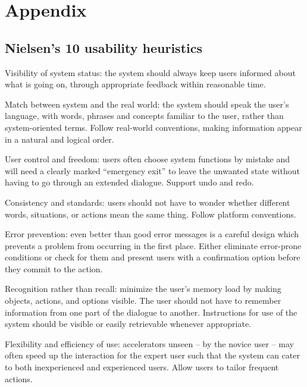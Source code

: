 \newpage
\appendix


\section{Appendix}

    \subsection{Nielsen's 10 usability heuristics}\label{appendix_nielsen}
    \begin{nielsenenumerate}
        \item Visibility of system status: the system should always keep users informed about what is going on, through appropriate feedback within reasonable time.
        \item Match between system and the real world: the system should speak the user's language, with words, phrases and concepts familiar to the user, rather than system-oriented terms. Follow real-world conventions, making information appear in a natural and logical order.
        \item User control and freedom: users often choose system functions by mistake and will need a clearly marked ``emergency exit'' to leave the unwanted state without having to go through an extended dialogue. Support undo and redo.
        \item Consistency and standards: users should not have to wonder whether different words, situations, or actions mean the same thing. Follow platform conventions.
        \item Error prevention: even better than good error messages is a careful design which prevents a problem from occurring in the first place. Either eliminate error-prone conditions or check for them and present users with a confirmation option before they commit to the action.
        \item Recognition rather than recall: minimize the user's memory load by making objects, actions, and options visible. The user should not have to remember information from one part of the dialogue to another. Instructions for use of the system should be visible or easily retrievable whenever appropriate.
        \item Flexibility and efficiency of use: accelerators unseen -- by the novice user -- may often speed up the interaction for the expert user such that the system can cater to both inexperienced and experienced users. Allow users to tailor frequent actions. %

\end{nielsenenumerate}
